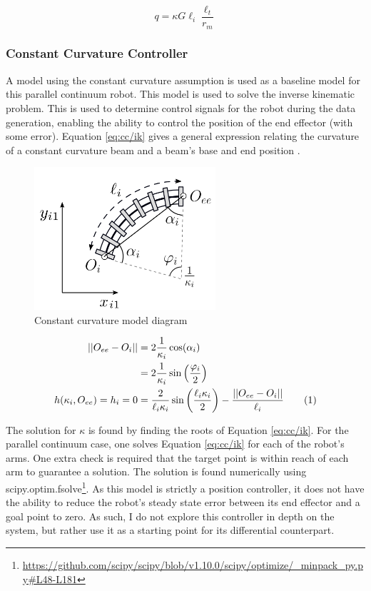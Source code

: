 \begin{equation}\label{eq:joint}
    q = \kappa G \ell_i \frac{\ell_t}{r_m}
\end{equation}

\subsubsection{Constant Curvature Controller}
A model using the constant curvature assumption \cite{doi:10.1177/0278364910368147} is used as a baseline model for this parallel continuum robot. This model is used to solve the inverse kinematic problem. This is used to determine control signals for the robot during the data generation, enabling the ability to control the position of the end effector (with some error). Equation \eqref{eq:cc/ik} gives a general expression relating the curvature of a constant curvature beam and a beam's base and end position \cite{slilge_2020}. 

\begin{figure}[H]
    \centering
    \includegraphics[width=0.6\textwidth]{images/constant_curvature_link.png}
    \caption{Constant curvature model diagram}
    \label{fig:cc_controller}
\end{figure}

\begin{align*}
|| O_{ee} - O_i || &= 2\frac{1}{\kappa_i}\cos(\alpha_i) \\
&= 2\frac{1}{\kappa_i}\sin\left(\frac{\varphi_i}{2}\right)\\
h(\kappa_i, O_{ee}) = h_i = 0 &= \frac{2}{\ell_i\kappa_i} \sin\left(\frac{\ell_i\kappa_i}{2}\right) - \frac{|| O_{ee} - O_i ||}{\ell_i}\stepcounter{equation}\tag{\theequation}\label{eq:cc/ik}
\end{align*}

The solution for $\kappa$ is found by finding the roots of Equation \eqref{eq:cc/ik}. For the parallel continuum case, one solves Equation \eqref{eq:cc/ik} for each of the robot's arms. One extra check is required that the target point is within reach of each arm to guarantee a solution. The solution is found numerically using scipy.optim.fsolve\footnote{\url{https://github.com/scipy/scipy/blob/v1.10.0/scipy/optimize/_minpack_py.py\#L48-L181}}. As this model is strictly a position controller, it does not have the ability to reduce the robot's steady state error between its end effector and a goal point to zero. As such, I do not explore this controller in depth on the system, but rather use it as a starting point for its differential counterpart. 

